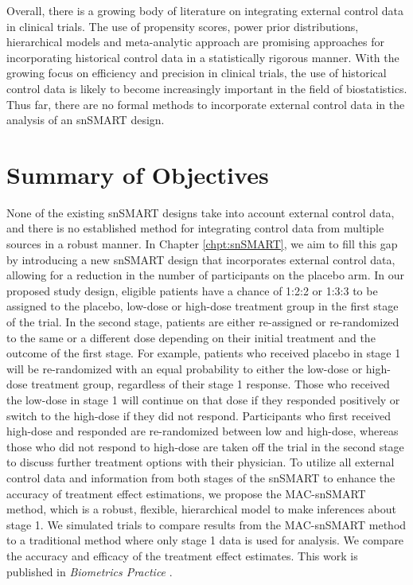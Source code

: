 Overall, there is a growing body of literature on integrating external control data in clinical trials. The use of propensity scores, power prior distributions, hierarchical models and meta-analytic approach are promising approaches for incorporating historical control data in a statistically rigorous manner. With the growing focus on efficiency and precision in clinical trials, the use of historical control data is likely to become increasingly important in the field of biostatistics. Thus far, there are no formal methods to incorporate external control data in the analysis of an \ac{snSMART} design.

\section{Summary of Objectives}
None of the existing \ac{snSMART} designs take into account external control data, and there is no established method for integrating control data from multiple sources in a robust manner. In Chapter \ref{chpt:snSMART}, we aim to fill this gap by introducing a new \ac{snSMART} design that incorporates external control data, allowing for a reduction in the number of participants on the placebo arm. In our proposed study design, eligible patients have a chance of 1:2:2 or 1:3:3 to be assigned to the placebo, low-dose or high-dose treatment group in the first stage of the trial. In the second stage, patients are either re-assigned or re-randomized to the same or a different dose depending on their initial treatment and the outcome of the first stage. For example, patients who received placebo in stage 1 will be re-randomized with an equal probability to either the low-dose or high-dose treatment group, regardless of their stage 1 response. Those who received the low-dose in stage 1 will continue on that dose if they responded positively or switch to the high-dose if they did not respond. Participants who first received high-dose and responded are re-randomized between low and high-dose, whereas those who did not respond to high-dose are taken off the trial in the second stage to discuss further treatment options with their physician. To utilize all external control data and information from both stages of the \ac{snSMART} to enhance the accuracy of treatment effect estimations, we propose the MAC-snSMART method, which is a robust, flexible, hierarchical model to make inferences about stage 1. We simulated trials to compare results from the MAC-snSMART method to a traditional method where only stage 1 data is used for analysis. We compare the accuracy and efficacy of the treatment effect estimates. This work is published in \textit{Biometrics Practice} \citep{wang2023dynamic}.

